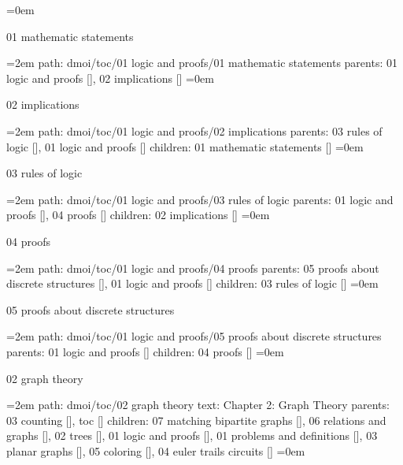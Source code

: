 \smallskip
\leftskip=0em
\par\endgroup
\bigskip
{}
01 mathematic statements
\smallskip
\par\begingroup
\leftskip=2em
path: dmoi/toc/01 logic and proofs/01 mathematic statements
\smallskip
parents:  01 logic and proofs [], 02 implications []
\smallskip
\leftskip=0em
\par\endgroup
\bigskip
{}
02 implications
\smallskip
\par\begingroup
\leftskip=2em
path: dmoi/toc/01 logic and proofs/02 implications
\smallskip
parents:  03 rules of logic [], 01 logic and proofs []
\smallskip
children: 01 mathematic statements []
\smallskip
\leftskip=0em
\par\endgroup
\bigskip
{}
03 rules of logic
\smallskip
\par\begingroup
\leftskip=2em
path: dmoi/toc/01 logic and proofs/03 rules of logic
\smallskip
parents:  01 logic and proofs [], 04 proofs []
\smallskip
children: 02 implications []
\smallskip
\leftskip=0em
\par\endgroup
\bigskip
{}
04 proofs
\smallskip
\par\begingroup
\leftskip=2em
path: dmoi/toc/01 logic and proofs/04 proofs
\smallskip
parents:  05 proofs about discrete structures [], 01 logic and proofs []
\smallskip
children: 03 rules of logic []
\smallskip
\leftskip=0em
\par\endgroup
\bigskip
{}
05 proofs about discrete structures
\smallskip
\par\begingroup
\leftskip=2em
path: dmoi/toc/01 logic and proofs/05 proofs about discrete structures
\smallskip
parents:  01 logic and proofs []
\smallskip
children: 04 proofs []
\smallskip
\leftskip=0em
\par\endgroup
\bigskip
{}
02 graph theory
\smallskip
\par\begingroup
\leftskip=2em
path: dmoi/toc/02 graph theory
\smallskip
text:  Chapter 2: Graph Theory
\smallskip
parents:  03 counting [], toc []
\smallskip
children: 07 matching bipartite graphs [], 06 relations and graphs [], 02 trees [], 01 logic and proofs [], 01 problems and definitions [], 03 planar graphs [], 05 coloring [], 04 euler trails circuits []
\smallskip
\leftskip=0em
\par\endgroup
